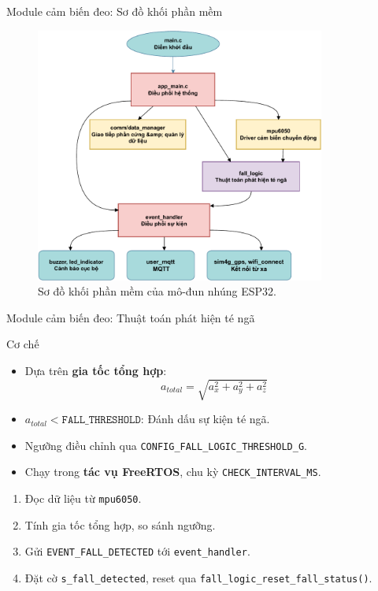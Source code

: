 \begin{frame}[fragile]{Module cảm biến đeo: Sơ đồ khối phần mềm}
    \begin{figure}
        \centering
        \includegraphics[width=0.85\textwidth,height=0.7\textheight,keepaspectratio]{images/module1_software_block-crop.pdf}
        \caption{Sơ đồ khối phần mềm của mô-đun nhúng ESP32.}
        \label{fig:module1_software_block}
    \end{figure}
\end{frame}

\begin{frame}{Module cảm biến đeo: Thuật toán phát hiện té ngã}
    \begin{block}{Cơ chế}
        \begin{itemize}
            \item Dựa trên \textbf{gia tốc tổng hợp}: 
            \[
            a_{total} = \sqrt{a_x^2 + a_y^2 + a_z^2}
            \]
            \item $a_{total} < \texttt{FALL\_THRESHOLD}$: Đánh dấu sự kiện té ngã.
            \item Ngưỡng điều chỉnh qua \texttt{CONFIG\_FALL\_LOGIC\_THRESHOLD\_G}.
            \item Chạy trong \textbf{tác vụ FreeRTOS}, chu kỳ \texttt{CHECK\_INTERVAL\_MS}.
        \end{itemize}
    \end{block}
    \begin{enumerate}
        \item Đọc dữ liệu từ \texttt{mpu6050}.
        \item Tính gia tốc tổng hợp, so sánh ngưỡng.
        \item Gửi \texttt{EVENT\_FALL\_DETECTED} tới \texttt{event\_handler}.
        \item Đặt cờ \texttt{s\_fall\_detected}, reset qua \texttt{fall\_logic\_reset\_fall\_status()}.
    \end{enumerate}
\end{frame}

